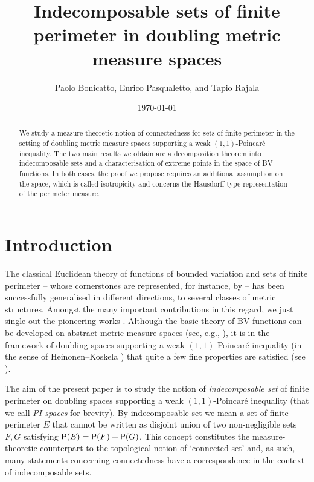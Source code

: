 \documentclass[reqno]{amsart}
\title[Indecomposable sets of finite perimeter in doubling metric measure spaces]
{Indecomposable sets of finite perimeter in doubling metric measure spaces}
\author{Paolo Bonicatto, Enrico Pasqualetto, and Tapio Rajala}
\numberwithin{equation}{section}
\newcommand{\1}{\mathbbm 1}
\renewcommand{\P}{{\sf P}}
\begin{document}
%
%
\date{\today} 
%
%
%
%
\begin{abstract}
We study a measure-theoretic notion of connectedness for sets
of finite perimeter in the setting of doubling metric measure spaces supporting
a weak \((1,1)\)-Poincar\'{e} inequality. The two main results we obtain
are a decomposition theorem into indecomposable sets and a characterisation of
extreme points in the space of BV functions. In both cases, the proof we
propose requires an additional assumption on the space, which is called isotropicity
and concerns the Hausdorff-type representation of the perimeter measure.
\end{abstract}
%
%
\maketitle
%
%
\tableofcontents
%
%
%
%
\section*{Introduction}
%
%
The classical Euclidean theory of functions of bounded variation and
sets of finite perimeter -- whose cornerstones are represented, for instance,
by \cite{Caccioppoli52,DeGiorgi54,Federer69,Giusti85,Mattila95,AFP00}
-- has been successfully generalised in different directions,
to several classes of metric structures. Amongst the many important
contributions in this regard, we just single
out the pioneering works \cite{BM95,FSSC96,GN96,DGN98,BBF99,Baldi01}.
Although the basic theory of BV functions can be developed on abstract
metric measure spaces (see, e.g., \cite{ADM14}), it is in the
framework of doubling spaces supporting a weak \((1,1)\)-Poincar\'{e}
inequality (in the sense of Heinonen--Koskela \cite{HK98}) that quite
a few fine properties are satisfied (see \cite{Ambrosio01,Ambrosio02,Miranda03}).

The aim of the present paper is to study the notion of \emph{indecomposable set}
of finite perimeter on doubling spaces supporting a weak \((1,1)\)-Poincar\'{e}
inequality (that we call \emph{PI spaces} for brevity).
By indecomposable set we mean a set of finite perimeter \(E\) that cannot be
written as disjoint union of two non-negligible sets \(F,G\) satisfying
\(\P(E)=\P(F)+\P(G)\). This concept constitutes the measure-theoretic counterpart
to the topological notion of `connected set' and, as such, many statements concerning
connectedness have a correspondence in the context of indecomposable sets.
\end{document}
